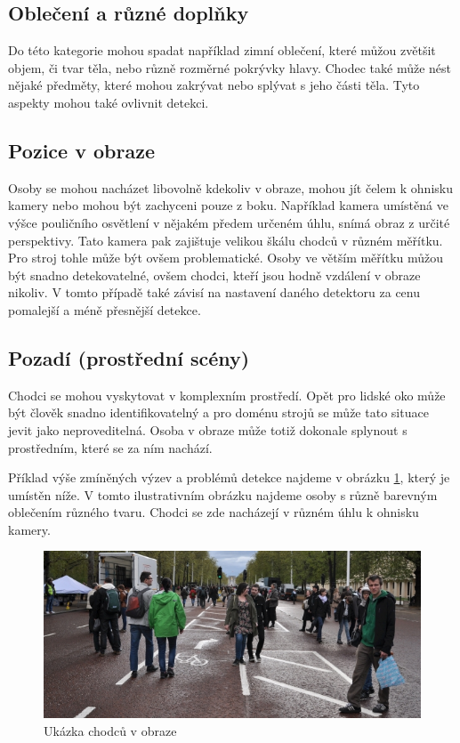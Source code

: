 \subsection{Oblečení a různé doplňky}
Do této kategorie mohou spadat například zimní oblečení, které můžou zvětšit objem, či tvar těla, nebo různě rozměrné pokrývky hlavy. Chodec také může nést nějaké předměty, které mohou zakrývat nebo splývat s jeho části těla. Tyto aspekty mohou také ovlivnit detekci.

\subsection{Pozice v obraze}
Osoby se mohou nacházet libovolně kdekoliv v obraze, mohou jít čelem k ohnisku kamery nebo mohou být zachyceni pouze z boku. Například kamera umístěná ve výšce pouličního osvětlení v nějakém předem určeném úhlu, snímá obraz z určité perspektivy. Tato kamera pak zajištuje velikou škálu chodců v různém měřítku. Pro stroj tohle může být ovšem problematické. Osoby ve větším měřítku můžou být snadno detekovatelné, ovšem chodci, kteří jsou hodně vzdálení v obraze nikoliv. V tomto případě také závisí na nastavení daného detektoru za cenu pomalejší a méně přesnější detekce. 

\subsection{Pozadí (prostřední scény)}
Chodci se mohou vyskytovat v komplexním prostředí. Opět pro lidské oko může být člověk snadno identifikovatelný a pro doménu strojů se může tato situace jevit jako neproveditelná. Osoba v obraze může totiž dokonale splynout s prostředním, které se za ním nachází.  

Příklad výše zmíněných výzev a problémů detekce najdeme v obrázku \ref{pedestrians}, který je umístěn níže. V tomto ilustrativním obrázku najdeme osoby s různě barevným oblečením různého tvaru. Chodci se zde nacházejí v různém úhlu k ohnisku kamery. 

\begin{figure}[H]
\centering
\includegraphics[width=15cm]{figures/pedestrians}
\caption{Ukázka chodců v obraze}
\label{pedestrians}
\end{figure}